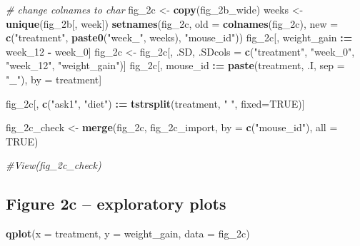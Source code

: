 \documentclass[]{book}
\newenvironment{Shaded}{\begin{snugshade}}{\end{snugshade}}
\newcommand{\CommentTok}[1]{\textcolor[rgb]{0.56,0.35,0.01}{\textit{#1}}}
\newcommand{\DataTypeTok}[1]{\textcolor[rgb]{0.13,0.29,0.53}{#1}}
\newcommand{\DecValTok}[1]{\textcolor[rgb]{0.00,0.00,0.81}{#1}}
\newcommand{\ErrorTok}[1]{\textcolor[rgb]{0.64,0.00,0.00}{\textbf{#1}}}
\newcommand{\KeywordTok}[1]{\textcolor[rgb]{0.13,0.29,0.53}{\textbf{#1}}}
\newcommand{\NormalTok}[1]{#1}
\newcommand{\OperatorTok}[1]{\textcolor[rgb]{0.81,0.36,0.00}{\textbf{#1}}}
\newcommand{\OtherTok}[1]{\textcolor[rgb]{0.56,0.35,0.01}{#1}}
\newcommand{\StringTok}[1]{\textcolor[rgb]{0.31,0.60,0.02}{#1}}
\begin{document}
\begin{Shaded}
\begin{Highlighting}[]
\CommentTok{# change colnames to char}
\NormalTok{fig_2c <-}\StringTok{ }\KeywordTok{copy}\NormalTok{(fig_2b_wide)}
\NormalTok{weeks <-}\StringTok{ }\KeywordTok{unique}\NormalTok{(fig_2b[, week])}
\KeywordTok{setnames}\NormalTok{(fig_2c,}
         \DataTypeTok{old =} \KeywordTok{colnames}\NormalTok{(fig_2c),}
         \DataTypeTok{new =} \KeywordTok{c}\NormalTok{(}\StringTok{"treatment"}\NormalTok{, }\KeywordTok{paste0}\NormalTok{(}\StringTok{"week_"}\NormalTok{, weeks), }\StringTok{"mouse_id"}\NormalTok{))}
\NormalTok{fig_2c[, weight_gain }\OperatorTok{:}\ErrorTok{=}\StringTok{ }\NormalTok{week_}\DecValTok{12} \OperatorTok{-}\StringTok{ }\NormalTok{week_}\DecValTok{0}\NormalTok{]}
\NormalTok{fig_2c <-}\StringTok{ }\NormalTok{fig_2c[, .SD, .SDcols =}\StringTok{ }\KeywordTok{c}\NormalTok{(}\StringTok{"treatment"}\NormalTok{,}
                                \StringTok{"week_0"}\NormalTok{,}
                                \StringTok{"week_12"}\NormalTok{,}
                                \StringTok{"weight_gain"}\NormalTok{)]}
\NormalTok{fig_2c[, mouse_id }\OperatorTok{:}\ErrorTok{=}\StringTok{ }\KeywordTok{paste}\NormalTok{(treatment, .I, }\DataTypeTok{sep =} \StringTok{"_"}\NormalTok{),}
\NormalTok{       by =}\StringTok{ }\NormalTok{treatment]}

\NormalTok{fig_2c[, }\KeywordTok{c}\NormalTok{(}\StringTok{"ask1"}\NormalTok{, }\StringTok{"diet"}\NormalTok{) }\OperatorTok{:}\ErrorTok{=}\StringTok{ }\KeywordTok{tstrsplit}\NormalTok{(treatment, }\StringTok{" "}\NormalTok{, }\DataTypeTok{fixed=}\OtherTok{TRUE}\NormalTok{)]}

\NormalTok{fig_2c_check <-}\StringTok{ }\KeywordTok{merge}\NormalTok{(fig_2c,}
\NormalTok{                fig_2c_import,}
                \DataTypeTok{by =} \KeywordTok{c}\NormalTok{(}\StringTok{"mouse_id"}\NormalTok{),}
                \DataTypeTok{all =} \OtherTok{TRUE}\NormalTok{)}

\CommentTok{#View(fig_2c_check)}
\end{Highlighting}
\end{Shaded}

\hypertarget{figure-2c-exploratory-plots}{%
\subsection{Figure 2c -- exploratory plots}\label{figure-2c-exploratory-plots}}

\begin{Shaded}
\begin{Highlighting}[]
\KeywordTok{qplot}\NormalTok{(}\DataTypeTok{x =}\NormalTok{ treatment,}
      \DataTypeTok{y =}\NormalTok{ weight_gain,}
      \DataTypeTok{data =}\NormalTok{ fig_2c)}
\end{Highlighting}
\end{Shaded}
\end{document}
